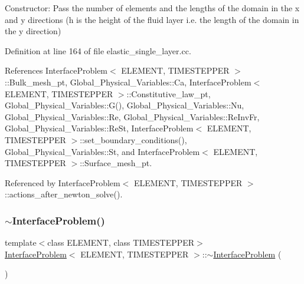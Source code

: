 Constructor\+: Pass the number of elements and the lengths of the domain in the x and y directions (h is the height of the fluid layer i.\+e. the length of the domain in the y direction) 

Definition at line 164 of file elastic\+\_\+single\+\_\+layer.\+cc.



References Interface\+Problem$<$ E\+L\+E\+M\+E\+N\+T, T\+I\+M\+E\+S\+T\+E\+P\+P\+E\+R $>$\+::\+Bulk\+\_\+mesh\+\_\+pt, Global\+\_\+\+Physical\+\_\+\+Variables\+::\+Ca, Interface\+Problem$<$ E\+L\+E\+M\+E\+N\+T, T\+I\+M\+E\+S\+T\+E\+P\+P\+E\+R $>$\+::\+Constitutive\+\_\+law\+\_\+pt, Global\+\_\+\+Physical\+\_\+\+Variables\+::\+G(), Global\+\_\+\+Physical\+\_\+\+Variables\+::\+Nu, Global\+\_\+\+Physical\+\_\+\+Variables\+::\+Re, Global\+\_\+\+Physical\+\_\+\+Variables\+::\+Re\+Inv\+Fr, Global\+\_\+\+Physical\+\_\+\+Variables\+::\+Re\+St, Interface\+Problem$<$ E\+L\+E\+M\+E\+N\+T, T\+I\+M\+E\+S\+T\+E\+P\+P\+E\+R $>$\+::set\+\_\+boundary\+\_\+conditions(), Global\+\_\+\+Physical\+\_\+\+Variables\+::\+St, and Interface\+Problem$<$ E\+L\+E\+M\+E\+N\+T, T\+I\+M\+E\+S\+T\+E\+P\+P\+E\+R $>$\+::\+Surface\+\_\+mesh\+\_\+pt.



Referenced by Interface\+Problem$<$ E\+L\+E\+M\+E\+N\+T, T\+I\+M\+E\+S\+T\+E\+P\+P\+E\+R $>$\+::actions\+\_\+after\+\_\+newton\+\_\+solve().

\mbox{\label{classInterfaceProblem_a90c191f8046069099b199743e7ce7111}} 
\subsubsection{\texorpdfstring{$\sim$\+Interface\+Problem()}{~InterfaceProblem()}\hspace{0.1cm}{\footnotesize\ttfamily [1/2]}}
{\footnotesize\ttfamily template$<$class E\+L\+E\+M\+E\+NT, class T\+I\+M\+E\+S\+T\+E\+P\+P\+ER$>$ \\
\hyperlink{classInterfaceProblem}{Interface\+Problem}$<$ E\+L\+E\+M\+E\+NT, T\+I\+M\+E\+S\+T\+E\+P\+P\+ER $>$\+::$\sim$\hyperlink{classInterfaceProblem}{Interface\+Problem} (\begin{DoxyParamCaption}{ }\end{DoxyParamCaption})\hspace{0.3cm}{\ttfamily [inline]}}



